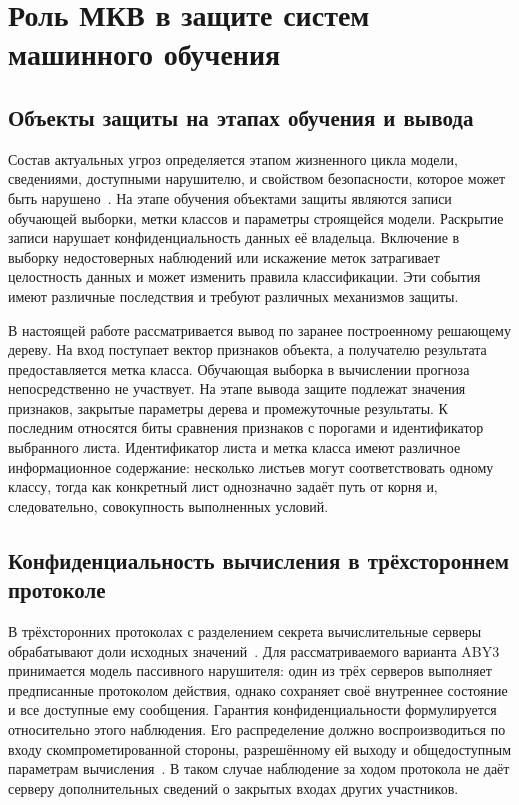 \section{Роль МКВ в защите систем машинного обучения}
\label{sec:threats}

\subsection{Объекты защиты на этапах обучения и вывода}

Состав актуальных угроз определяется этапом жизненного цикла модели,
сведениями, доступными нарушителю, и свойством безопасности, которое
может быть нарушено~\cite{ilyushin2022attacks,papernot2018sok}.
На этапе обучения объектами защиты являются записи обучающей выборки,
метки классов и параметры строящейся модели. Раскрытие записи нарушает
конфиденциальность данных её владельца. Включение в выборку недостоверных
наблюдений или искажение меток затрагивает целостность данных и может
изменить правила классификации. Эти события имеют различные последствия
и требуют различных механизмов защиты.

В настоящей работе рассматривается вывод по заранее построенному
решающему дереву. На вход поступает вектор признаков объекта, а
получателю результата предоставляется метка класса. Обучающая выборка
в вычислении прогноза непосредственно не участвует. На этапе вывода
защите подлежат значения признаков, закрытые параметры дерева и
промежуточные результаты. К последним относятся биты сравнения
признаков с порогами и идентификатор выбранного листа. Идентификатор
листа и метка класса имеют различное информационное содержание:
несколько листьев могут соответствовать одному классу, тогда как
конкретный лист однозначно задаёт путь от корня и, следовательно,
совокупность выполненных условий.

\subsection{Конфиденциальность вычисления в трёхстороннем протоколе}

В трёхсторонних протоколах с разделением секрета вычислительные серверы
обрабатывают доли исходных значений~\cite{zapechnikov2022three}.
Для рассматриваемого варианта ABY3 принимается модель пассивного
нарушителя: один из трёх серверов выполняет предписанные протоколом
действия, однако сохраняет своё внутреннее состояние и все доступные ему
сообщения. Гарантия конфиденциальности формулируется относительно этого
наблюдения. Его распределение должно воспроизводиться по входу
скомпрометированной стороны, разрешённому ей выходу и общедоступным
параметрам вычисления~\cite{araki2016,mohassel2018aby3}.
В таком случае наблюдение за ходом протокола не даёт серверу дополнительных
сведений о закрытых входах других участников.

